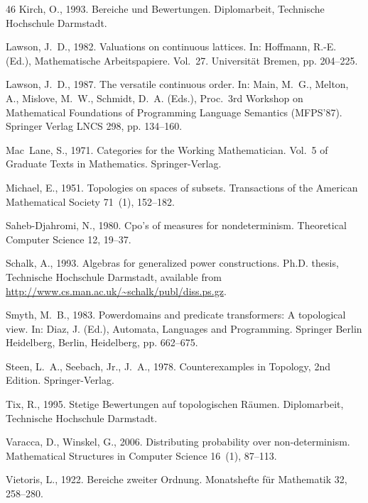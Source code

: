 \documentclass[preprint,12pt]{elsarticle}
\begin{document}
\begin{thebibliography}{46}
Kirch, O., 1993. Bereiche und {B}ewertungen. Diplomarbeit, Technische
  Hochschule Darmstadt.

Lawson, J.~D., 1982. Valuations on continuous lattices. In: Hoffmann, R.-E.
  (Ed.), Mathematische Arbeitspapiere. Vol.~27. Universit{\"a}t Bremen, pp.
  204--225.

Lawson, J.~D., 1987. The versatile continuous order. In: Main, M.~G., Melton,
  A., Mislove, M.~W., Schmidt, D.~A. (Eds.), Proc.\ 3rd Workshop on
  Mathematical Foundations of Programming Language Semantics (MFPS'87).
  Springer Verlag LNCS 298, pp. 134--160.

Mac~Lane, S., 1971. Categories for the Working Mathematician. Vol.~5 of
  Graduate Texts in Mathematics. Springer-Verlag.

Michael, E., 1951. Topologies on spaces of subsets. Transactions of the
  American Mathematical Society 71~(1), 152--182.

Saheb-Djahromi, N., 1980. Cpo's of measures for nondeterminism. Theoretical
  Computer Science 12, 19--37.

Schalk, A., 1993. Algebras for generalized power constructions. Ph.D. thesis,
  Technische Hochschule Darmstadt, available from
  \url{http://www.cs.man.ac.uk/~schalk/publ/diss.ps.gz}.

Smyth, M.~B., 1983. Powerdomains and predicate transformers: A topological
  view. In: Diaz, J. (Ed.), Automata, Languages and Programming. Springer
  Berlin Heidelberg, Berlin, Heidelberg, pp. 662--675.

Steen, L.~A., Seebach, Jr., J.~A., 1978. Counterexamples in Topology, 2nd
  Edition. Springer-Verlag.

Tix, R., 1995. {S}tetige {B}ewertungen auf topologischen {R\"a}umen.
  Diplomarbeit, Technische Hochschule Darmstadt.

Varacca, D., Winskel, G., 2006. Distributing probability over non-determinism.
  Mathematical Structures in Computer Science 16~(1), 87--113.

Vietoris, L., 1922. {B}ereiche zweiter {O}rdnung. Monatshefte f\"ur Mathematik
  32, 258--280.

\end{thebibliography}
\else

\fi
\end{document}
